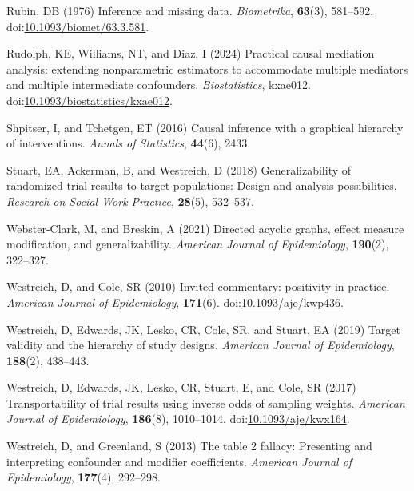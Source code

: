 \documentclass[
  single column]{article}
\newlength{\cslhangindent}
\newenvironment{CSLReferences}[2] %
 {\begin{list}{}{%
  \setlength{\itemindent}{0pt}
  \setlength{\leftmargin}{0pt}
  \setlength{\parsep}{0pt}
  \ifodd #1
   \setlength{\leftmargin}{\cslhangindent}
   \setlength{\itemindent}{-1\cslhangindent}
  \fi
  \setlength{\itemsep}{#2\baselineskip}}}
 {\end{list}}
\begin{document}
\begin{CSLReferences}{1}{0}
Rubin, DB (1976) Inference and missing data. \emph{Biometrika},
\textbf{63}(3), 581--592.
doi:\href{https://doi.org/10.1093/biomet/63.3.581}{10.1093/biomet/63.3.581}.

Rudolph, KE, Williams, NT, and Diaz, I (2024) {Practical causal
mediation analysis: extending nonparametric estimators to accommodate
multiple mediators and multiple intermediate confounders}.
\emph{Biostatistics}, kxae012.
doi:\href{https://doi.org/10.1093/biostatistics/kxae012}{10.1093/biostatistics/kxae012}.

Shpitser, I, and Tchetgen, ET (2016) Causal inference with a graphical
hierarchy of interventions. \emph{Annals of Statistics}, \textbf{44}(6),
2433.

Stuart, EA, Ackerman, B, and Westreich, D (2018) Generalizability of
randomized trial results to target populations: Design and analysis
possibilities. \emph{Research on Social Work Practice}, \textbf{28}(5),
532--537.

Webster-Clark, M, and Breskin, A (2021) Directed acyclic graphs, effect
measure modification, and generalizability. \emph{American Journal of
Epidemiology}, \textbf{190}(2), 322--327.

Westreich, D, and Cole, SR (2010) Invited commentary: positivity in
practice. \emph{American Journal of Epidemiology}, \textbf{171}(6).
doi:\href{https://doi.org/10.1093/aje/kwp436}{10.1093/aje/kwp436}.

Westreich, D, Edwards, JK, Lesko, CR, Cole, SR, and Stuart, EA (2019)
Target validity and the hierarchy of study designs. \emph{American
Journal of Epidemiology}, \textbf{188}(2), 438--443.

Westreich, D, Edwards, JK, Lesko, CR, Stuart, E, and Cole, SR (2017)
Transportability of trial results using inverse odds of sampling
weights. \emph{American Journal of Epidemiology}, \textbf{186}(8),
1010--1014.
doi:\href{https://doi.org/10.1093/aje/kwx164}{10.1093/aje/kwx164}.

Westreich, D, and Greenland, S (2013) The table 2 fallacy: Presenting
and interpreting confounder and modifier coefficients. \emph{American
Journal of Epidemiology}, \textbf{177}(4), 292--298.

\end{CSLReferences}
\end{document}
